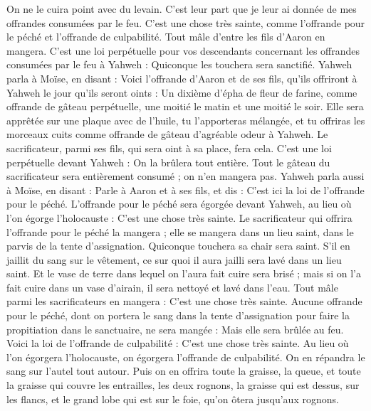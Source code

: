 \begin{multicols}{2}
On ne le cuira point avec du levain. C’est leur part que je leur ai donnée de mes offrandes consumées par le feu. C'est une chose très sainte, comme l’offrande pour le péché et l’offrande de culpabilité.
Tout mâle d'entre les fils d'Aaron en mangera. C'est une loi perpétuelle pour vos descendants concernant les offrandes consumées par le feu à Yahweh : Quiconque les touchera sera sanctifié.
Yahweh parla à Moïse, en disant :
Voici l'offrande d'Aaron et de ses fils, qu’ils offriront à Yahweh le jour qu'ils seront oints : Un dixième d'épha de fleur de farine, comme offrande de gâteau perpétuelle, une moitié le matin et une moitié le soir.
Elle sera apprêtée sur une plaque avec de l'huile, tu l'apporteras mélangée, et tu offriras les morceaux cuits comme offrande de gâteau d’agréable odeur à Yahweh.
Le sacrificateur, parmi ses fils, qui sera oint à sa place, fera cela. C’est une loi perpétuelle devant Yahweh : On la  brûlera tout entière.
Tout le gâteau du sacrificateur sera entièrement consumé ; on n’en mangera pas.
Yahweh parla aussi à Moïse, en disant :
Parle à Aaron et à ses fils, et dis : C'est ici la loi de l’offrande pour le péché. L’offrande pour le péché sera égorgée devant Yahweh, au lieu où l’on égorge l'holocauste : C'est une chose très sainte.
Le sacrificateur qui offrira l’offrande pour le péché la mangera ; elle se mangera dans un lieu saint, dans le parvis de la tente d'assignation.
Quiconque touchera sa chair sera saint. S'il en jaillit du sang sur le vêtement, ce sur quoi il aura jailli sera lavé dans un lieu saint.
Et le vase de terre dans lequel on l'aura fait cuire sera brisé ; mais si on l'a fait cuire dans un vase d'airain, il sera nettoyé et lavé dans l'eau.
Tout mâle parmi les sacrificateurs en mangera : C'est une chose très sainte.
Aucune offrande pour le péché, dont on portera le sang dans la tente d'assignation pour faire la propitiation dans le sanctuaire, ne sera mangée : Mais elle sera brûlée au feu.
\VerseOne{}Voici la loi de l’offrande de culpabilité : C’est une chose très sainte.
Au lieu où l’on égorgera l’holocauste, on égorgera l’offrande de culpabilité. On en répandra le sang sur l’autel tout autour.
Puis on en offrira toute la graisse, la queue, et toute la graisse qui couvre les entrailles,
les deux rognons, la graisse qui est dessus, sur les flancs, et le grand lobe qui est sur le foie, qu’on ôtera jusqu’aux rognons.

\end{multicols}
